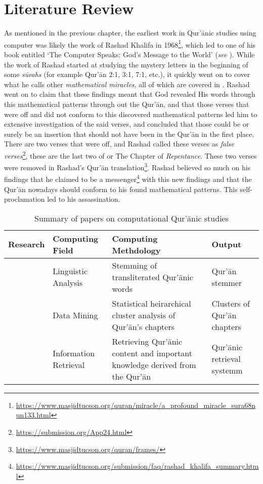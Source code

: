 \chapter{Literature Review}

As mentioned in the previous chapter, the earliest work in Qur'\=anic studies using computer was likely the work of Rashad Khalifa in 1968\footnote{\url{https://www.masjidtucson.org/quran/miracle/a_profound_miracle_sura68nun133.html}}, which led to one of his book entitled `The Computer Speaks: God's Message to the World' (\textit{see} ). While the work of Rashad started at studying the mystery letters in the beginning of some \textit{s\=urahs}  (for example Qur'\=an 2:1, 3:1, 7:1, etc.), it quickly went on to cover what he calls other \textit{mathematical miracles}, all of which are covered in . Rashad went on to claim that these findings meant that God revealed His words through this mathematical patterns through out the Qur'\=an, and that those verses that were off and did not conform to this discovered mathematical patterns led him to extensive investigation of the said verses, and concluded that those could be or surely be an insertion that should not have been in the Qur'\=an in the first place. There are two verses that were off, and Rashad called these verses as \textit{false verses}\footnote{\url{https://submission.org/App24.html}}, these are the last two   of   or The Chapter of \textit{Repentance}. These two verses were removed in Rashad's Qur'\=an translation\footnote{\url{https://www.masjidtucson.org/quran/frames/}}. Rashad believed so much on his findings that he claimed to be a messenger\footnote{\url{https://www.masjidtucson.org/submission/faq/rashad_khalifa_summary.html}} with this new findings and that the Qur'\=an nowadays should conform to his found mathematical patterns. This self-proclamation led to his assassination.

\begin{table}[!h]
    \begin{flushleft}
        \caption{Summary of papers on computational Qur'\=anic studies}
        \begin{tabularx}{\textwidth}{YYYY}
            \toprule
            \textbf{Research} & \textbf{Computing Field} &\textbf{Computing Methdology} & \textbf{Output}\\\midrule
            &Linguistic Analysis &Stemming of transliterated Qur'\=anic words&Qur'\=an stemmer\\
            &Data Mining&Statistical heirarchical cluster analysis of Qur'\=an's chapters&Clusters of Qur'\=an chapters\\
            &Information Retrieval&Retrieving Qur'\=anic content and important knowledge derived from the Qur'\=an& Qur'\=anic retrieval systemm\\
            \bottomrule
        \end{tabularx}
    \end{flushleft}
    \label{tab:single_ave}
\end{table}


